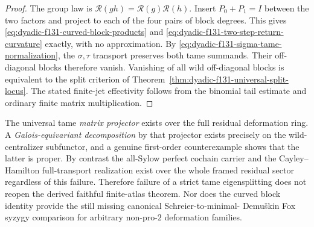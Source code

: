 \begin{proof}
The group law is
$\mathcal R(gh)
=\mathcal R(g)\mathcal R(h)$.
Insert $P_0+P_1=I$
between the two factors
and project to each of
the four pairs of block
degrees.  This gives
\eqref{eq:dyadic-f131-curved-block-products}
and
\eqref{eq:dyadic-f131-two-step-return-curvature}
exactly, with no
approximation.
By
\eqref{eq:dyadic-f131-sigma-tame-normalization},
the $\sigma,\tau$
transport preserves
both tame summands.
Their off-diagonal
blocks therefore vanish.
Vanishing of all wild
off-diagonal blocks is
equivalent to the split
criterion of
Theorem~\ref{thm:dyadic-f131-universal-split-locus}.
The stated finite-jet
effectivity follows
from the binomial
tail estimate and
ordinary finite
matrix multiplication.
\end{proof}

\begin{remark}
\label{rem:dyadic-f131-split-versus-global-atlas}
The universal tame
\emph{matrix projector}
exists over the full
residual deformation
ring.  A
\emph{Galois-equivariant
decomposition} by that
projector exists
precisely on the
wild-centralizer
subfunctor, and a
genuine first-order
counterexample shows
that the latter is
proper.
By contrast the
all-Sylow perfect
cochain carrier and
the Cayley--Hamilton
full-transport
realization exist
over the whole
framed residual
sector regardless
of this failure.
Therefore failure of
a strict tame
eigensplitting does
not reopen the
derived faithful
finite-atlas theorem.
Nor does the curved
block identity
provide the still
missing canonical
Schreier-to-minimal-
Demu\v{s}kin Fox
syzygy comparison
for arbitrary
non-pro-$2$
deformation families.
\end{remark}

